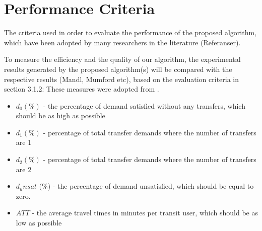 \section{Performance Criteria}


The criteria used in order to evaluate the performance of the proposed algorithm, which have been adopted by many researchers in the literature (Referanser).

To measure the efficiency and the quality of our algorithm, the experimental results generated by the proposed algorithm(s) will be compared with the respective results (Mandl, Mumford etc), based on the evaluation criteria in section 3.1.2: 
These measures were adopted from \citet{kechagiopoulos14}.

\begin{itemize}
\item $d_0 (\%)$ - the percentage of demand satisfied without any transfers, which should be as high as possible
\item $d_1 (\%)$ - percentage of total transfer demands where the number of transfers are 1
\item $d_2 (\%)$ - percentage of total transfer demands where the number of transfers are 2
\item $d_unsat$ (\%) - the percentage of demand unsatisfied, which should be equal to zero.
\item $ATT$  - the average travel times in minutes per transit user, which should be as low as possible
\end{itemize}




